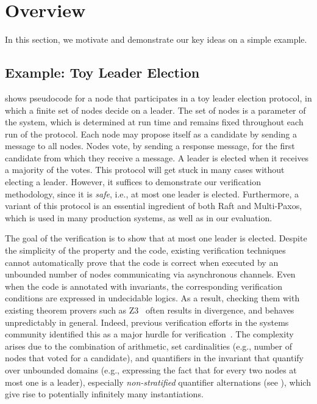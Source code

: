 \section{Overview}
\label{sec:overview}
In this section, we motivate and demonstrate our key ideas on a simple example.


\subsection{Example: Toy Leader Election}
 shows pseudocode for a node that participates in a
toy leader election protocol, in which a finite set of nodes decide on
a leader.  The set of nodes is a parameter of the system, which is
determined at run time and remains fixed throughout each run of the
protocol.  Each node may propose itself as a candidate by sending a
message to all nodes. Nodes vote, by sending a response message, for
the first candidate from which they receive a message. A leader is
elected when it receives a majority of the votes. This protocol will
get stuck in many cases without electing a leader. However, it
suffices to demonstrate our verification methodology, since it is
\emph{safe}, i.e., at most one leader is elected. Furthermore, a
variant of this protocol is an essential ingredient of both Raft and
Multi-Paxos, which is used in many production systems, as well as in
our evaluation.

The goal of the verification is to show that at most one leader is
elected.
%
Despite the simplicity of the property and the code, existing
verification techniques cannot automatically prove that the code is correct when executed by an unbounded
number of nodes communicating via asynchronous channels. Even when the code is annotated with invariants, the
corresponding verification conditions are expressed in undecidable
logics.
As a result, checking them with existing theorem provers such as Z3~\cite{Z3} often
results in divergence, and behaves unpredictably in general. Indeed,
previous verification efforts in the systems community identified this
as a major hurdle for verification~\cite{IronFleet}. The complexity arises due to the
combination of arithmetic, set cardinalities (e.g., number of nodes that voted for a candidate), and quantifiers in the invariant that quantify over unbounded domains
(e.g., expressing the fact that for every two nodes at most one is a
leader), especially \emph{non-stratified} quantifier alternations (see ), which give rise to potentially infinitely many instantiations.

